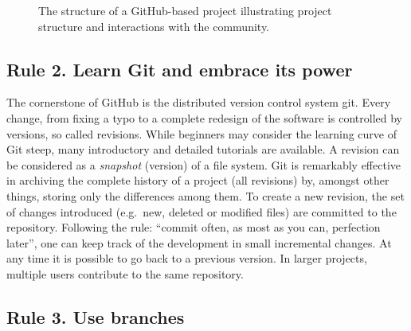 \documentclass[10pt,letterpaper]{article}
\begin{document}
\begin{figure}[htbp]
\centering
\caption{The structure of a GitHub-based project illustrating project
structure and interactions with the community.}
\end{figure}

\subsection*{Rule 2. Learn Git and embrace its
power}\label{rule-2.-learn-git-and-embrace-its-power}

The cornerstone of GitHub is the distributed version control system git.
Every change, from fixing a typo to a complete redesign of the software
is controlled by versions, so called revisions. While beginners may
consider the learning curve of Git steep, many introductory and detailed
tutorials are available. A revision can be considered as a
\emph{snapshot} (version) of a file system. Git is remarkably effective
in archiving the complete history of a project (all revisions) by,
amongst other things, storing only the differences among them. To create
a new revision, the set of changes introduced (e.g.~new, deleted or
modified files) are committed to the repository. Following the rule:
``commit often, as most as you can, perfection later'', one can keep
track of the development in small incremental changes. At any time it is
possible to go back to a previous version. In larger projects, multiple
users contribute to the same repository.

\subsection*{Rule 3. Use branches}\label{rule-3.-use-branches}
\end{document}
